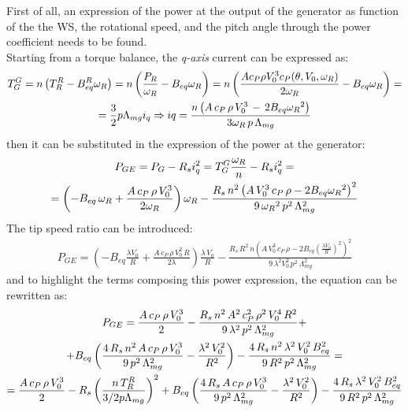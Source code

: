 First of all, an expression of the power at the output of the generator as function of the the WS, the rotational speed, and the pitch angle through the power coefficient needs to be found. \\
Starting from a torque balance, the \textit{q-axis} current can be expressed as:
\begin{gather}
  T_G^G = n\left(T_R^R - B_{eq}^R\omega_R\right) = n\left(\frac{P_R}{\omega_R} - B_{eq}\omega_R\right) = n\left(\frac{A c_P \rho V_0^3 c_P(\theta, V_0, \omega_R)}{2\omega_R} - B_{eq}\omega_R\right) = \notag \\
   = \frac{3}{2}p\Lambda_{mg}i_q \Rightarrow iq = \frac{n\left(A \, c_P \, \rho \, V_0^3 \,-\,2B_{eq}{\omega_R}^2\right)}{3\omega_R\,p\,\Lambda_{mg}} 
\end{gather}
then it can be substituted in the expression of the power at the generator:
\begin{gather}
  P_{GE} = P_{G} - R_s i_q^2 = T_G^G \frac{\omega_R}{n} - R_s i_q^2 = \\ \notag
  = \left(-B_{eq}\,\omega_R + \frac{A\,c_P\,\rho\,V_0^3}{2\omega_R}\right)\omega_R - \frac{R_s\, n^2\left(A\,V_0^3\,c_P\,\rho - 2B_{eq}{\omega_R}^{2}\right)^2}{9\,{\omega_R}^{2}\,p^2\,\Lambda_{mg}^2} \label{eq:P_G_out_eq}
\end{gather}
The tip speed ratio can be introduced:
\begin{gather}
  P_{GE} = \left(-B_{eq}\frac{\lambda V_0}{R} + \frac{A\,c_P\,\rho\,V_0^2\,R}{2\lambda}\right)\frac{\lambda \, V_0}{R} - \frac{R_s\,R^2\,n\left(A\,V_0^3\,c_P\,\rho - 2B_{eq}\left(\frac{\lambda V_0}{R}\right)^2\right)^2}{9\,\lambda^2V_0^2\,p^2\,\Lambda_{mg}^2}\label{eq:P_G_out_lambda}
\end{gather} 
and to highlight the terms composing this power expression, the equation can be rewritten as:
\begin{gather} 
   P_{GE} = \frac{A\,c_P\,\rho\,V_0^3}{2} - \frac{R_s\,n^2\,A^2\,c_P^2\,\rho^2\,V_0^4\,R^2}{9\,\lambda^2\,p^2\,\Lambda_{mg}^2} + \notag \\
   +B_{eq}\left(\frac{4\,R_s\,n^2\,A\,c_P\,\rho\,V_0^3}{9\,p^2\,\Lambda_{mg}^2} - \frac{\lambda^2\,V_0^2}{R^2}\right) - \frac{4\,R_s\,n^2\,\lambda^2\,V_0^2\,B_{eq}^2}{9\,R^2\,p^2\,\Lambda_{mg}^2} =  \notag \\
   = \frac{A\,c_P\,\rho\,V_0^3}{2} - R_s \left(\frac{n\,T_R^R}{3/2p\Lambda_{mg}}\right)^2 + B_{eq}\left(\frac{4\,R_s\,A\,c_P\,\rho\,V_0^3}{9\,p^2\,\Lambda_{mg}^2} - \frac{\lambda^2\,V_0^2}{R^2}\right) - \frac{4\,R_s\,\lambda^2\,V_0^2\,B_{eq}^2}{9\,R^2\,p^2\,\Lambda_{mg}^2} 
   \label{eq:P_G_out_damping}
\end{gather}

